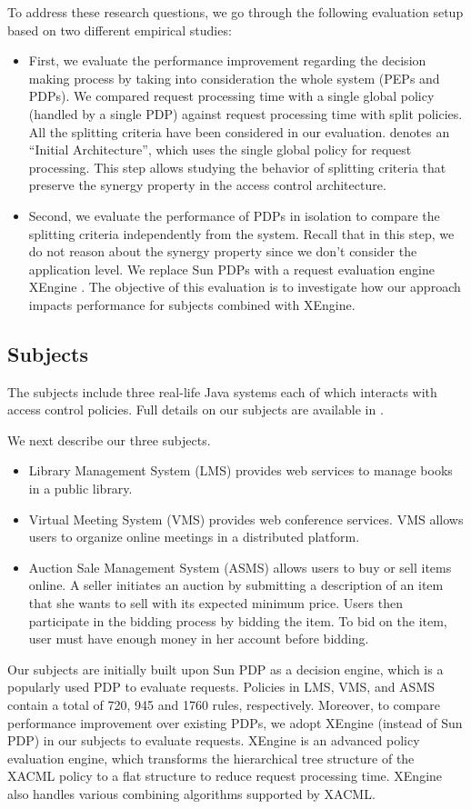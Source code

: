 To address these research questions, we go through the following evaluation setup based on two different empirical studies:
\begin{itemize}
\item First, we evaluate the performance improvement regarding the decision making process by taking into consideration the whole system 
(PEPs and PDPs). We compared request processing time with a single global policy (handled by a single PDP) against request processing time with
split policies. All the splitting criteria have been considered in our evaluation.
 denotes an ``Initial Architecture'', which uses the single global policy for request processing. 
This step allows studying the behavior of splitting criteria that preserve the synergy property in the access control architecture.

\item Second, we evaluate the performance of PDPs in isolation to compare the splitting criteria independently from the system.
Recall that in this step, we do not reason about the synergy property since we don't consider the application level.
We replace Sun PDPs with a request evaluation engine XEngine \cite{Xengine}. 
The objective of this evaluation is to investigate how our approach impacts performance for subjects combined with XEngine.
\end{itemize}

\subsection{Subjects}
The subjects include three real-life Java systems each of which interacts with access control policies. 
Full details on our subjects are available in \cite{evaluation}.


 We next describe our three subjects.
\begin{itemize}	
\item Library Management System (LMS) provides web services to manage books in a public library.
\item Virtual Meeting System (VMS) provides web conference services. VMS allows users to organize
online meetings in a distributed platform.
\item Auction Sale Management System (ASMS) allows users to buy or sell items online. A seller 
initiates an auction by submitting a description of an item that she wants to sell with its expected minimum 
price. Users then participate in the bidding process by
bidding the item. To bid on the item, user must have enough money in her account before bidding.
\end{itemize}
Our subjects are initially built upon Sun PDP \cite{sunxacml} as a decision engine, which is a popularly used PDP to evaluate
 requests. Policies in LMS, VMS, and ASMS contain a total of 720, 945 and 1760 rules, respectively.
Moreover, to compare performance improvement over existing PDPs, we adopt XEngine (instead of Sun PDP) in our subjects to evaluate requests.
XEngine is an advanced policy evaluation engine, which transforms the hierarchical tree structure of the XACML policy to a flat structure
to reduce request processing time. XEngine also handles various combining algorithms supported by XACML. 

